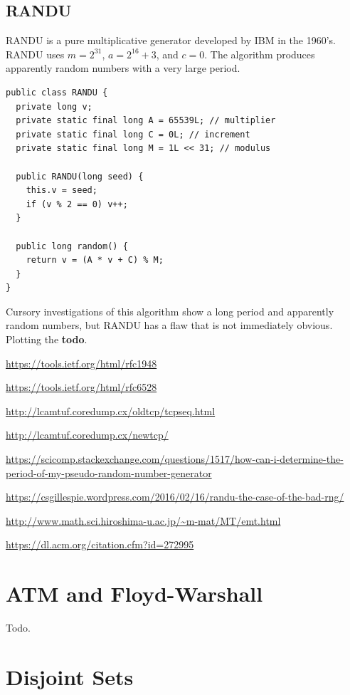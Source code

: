 \documentclass{book}
\begin{document}
\section{RANDU}

RANDU is a pure multiplicative generator developed by IBM in the 1960's. RANDU uses $m=2^{31}$, $a=2^{16}+3$, and $c=0$. The algorithm produces apparently random numbers with a very large period.

\begin{lstlisting}[caption={The RANDU PRNG implemented in Java}]
public class RANDU {
  private long v;
  private static final long A = 65539L; // multiplier
  private static final long C = 0L; // increment
  private static final long M = 1L << 31; // modulus

  public RANDU(long seed) {
    this.v = seed;
    if (v % 2 == 0) v++;
  }

  public long random() {
    return v = (A * v + C) % M;
  }
}
\end{lstlisting}

Cursory investigations of this algorithm show a long period and apparently random numbers, but RANDU has a flaw that is not immediately obvious. Plotting the \textbf{todo}.


\url{https://tools.ietf.org/html/rfc1948}

\url{https://tools.ietf.org/html/rfc6528}

\url{http://lcamtuf.coredump.cx/oldtcp/tcpseq.html}

\url{http://lcamtuf.coredump.cx/newtcp/}

\url{https://scicomp.stackexchange.com/questions/1517/how-can-i-determine-the-period-of-my-pseudo-random-number-generator}

\url{https://csgillespie.wordpress.com/2016/02/16/randu-the-case-of-the-bad-rng/}

\url{http://www.math.sci.hiroshima-u.ac.jp/~m-mat/MT/emt.html}

\url{https://dl.acm.org/citation.cfm?id=272995}

\chapter{ATM and Floyd-Warshall}

Todo.

\chapter{Disjoint Sets}
\end{document}
